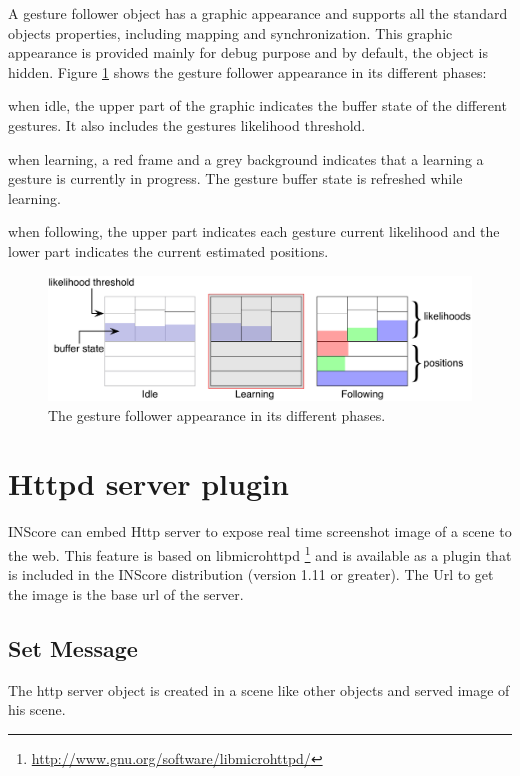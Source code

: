 \documentclass[a4paper,twoside]{report}
\newcommand{\sublevel}[1]	{\section{#1}}
\newcommand{\subsublevel}[1]	{\subsection{#1}}
\let\olditemize\itemize
\let\oldenditemize\enditemize
\renewenvironment{itemize} 	{\olditemize \setlength{\itemsep}{1mm}}{\oldenditemize}
\begin{document}
A gesture follower object has a graphic appearance and supports all the standard objects properties, including mapping and synchronization. This graphic appearance is provided mainly for debug purpose and by default, the object is hidden. Figure  \ref{fig:gfgraph} shows the gesture follower appearance in its different phases:
\begin{itemize}
\item when idle, the upper part of the graphic indicates the buffer state of the different gestures. It also includes the gestures likelihood threshold.
\item when learning, a red frame and a grey background indicates that a learning a gesture is currently in progress. The gesture buffer state is refreshed while learning.
\item when following, the upper part indicates each gesture current likelihood and the lower part indicates the current estimated positions.
\end{itemize}


\begin{figure}[h]
	\centering \includegraphics[width=0.95\columnwidth]{imgs/gesture-follower}
 \caption{The gesture follower appearance in its different phases.}
 \label{fig:gfgraph}
\end{figure}



\sublevel{Httpd server plugin}
\label{Httpd}

INScore can embed Http server to expose real time screenshot image of a scene to the web. This feature is based on libmicrohttpd \footnote{\url{http://www.gnu.org/software/libmicrohttpd/}} and is available as a plugin that is included in the INScore distribution (version 1.11 or greater). The Url to get the image is the base url of the server.

\subsublevel{Set Message}

The http server object is created in a scene like other objects and served image of his scene.
\end{document}
